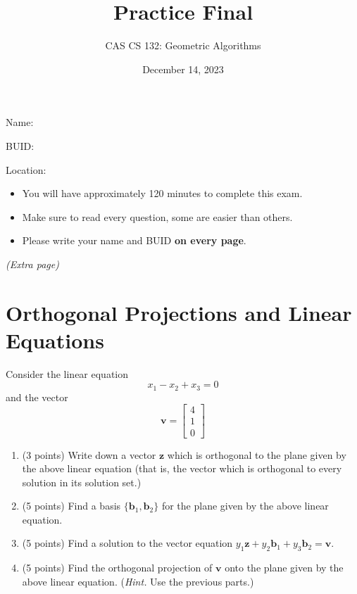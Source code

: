 \documentclass{article}
\title{Practice Final
} \author{CAS CS 132: Geometric Algorithms} \date{December 14, 2023}
\theoremstyle{remark} \newtheorem*{solution}{Solution}
\newcommand{\vv}[1]{\mathbf{#1}} \newcommand{\R}{\mathbb R}
\begin{document}
\maketitle

\noindent Name:

\bigskip

\noindent BUID:

\bigskip

\noindent Location:

\bigskip

\begin{itemize}
\item You will have approximately 120 minutes to complete this exam.
\item Make sure to read every question, some are easier than others.
\item Please write your name and BUID \textbf{on every page}.
\end{itemize}

\pagebreak
\textit{(Extra page)}

\pagebreak
\section{Orthogonal Projections and Linear Equations}

Consider the linear equation
\begin{displaymath}
  x_1 - x_2 + x_3 = 0
\end{displaymath}
and the vector
\begin{displaymath}
  \vv v =
  \begin{bmatrix}
    4 \\ 1 \\ 0
  \end{bmatrix}
\end{displaymath}

\begin{enumerate}
\item (3 points) Write down a vector $\vv z$ which is
  orthogonal to the plane given by the above linear equation (that is,
  the vector which is orthogonal to every solution in its solution
  set.)
\item (5 points) Find a basis $\{\vv b_1, \vv b_2\}$ for the plane
  given by the above linear equation.
\item (5 points) Find a solution to the vector equation $y_1\vv z + y_2\vv
  b_1 + y_3\vv b_2 = \vv v$.
\item (5 points) Find the orthogonal projection of $\vv v$ onto the
  plane given by the above linear equation. (\textit{Hint.} Use the
  previous parts.)
\end{enumerate}
\end{document}
